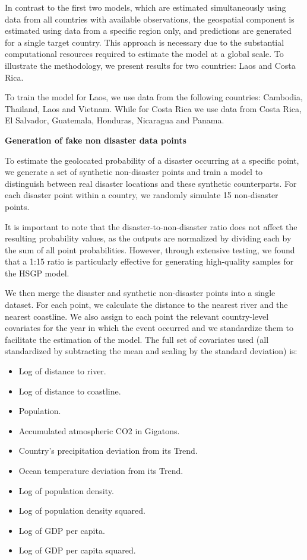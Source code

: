 In contrast to the first two models, which are estimated simultaneously using data from all countries with available observations, the geospatial component is estimated using data from a specific region only, and predictions are generated for a single target country. This approach is necessary due to the substantial computational resources required to estimate the model at a global scale. To illustrate the methodology, we present results for two countries: Laos and Costa Rica.

To train the model for Laos, we use data from the following countries: Cambodia, Thailand, Laos and Vietnam. While for Costa Rica we use data from Costa Rica, El Salvador, Guatemala, Honduras, Nicaragua and Panama.

\textbf{Generation of fake non disaster data points}

To estimate the geolocated probability of a disaster occurring at a specific point, we generate a set of synthetic non-disaster points and train a model to distinguish between real disaster locations and these synthetic counterparts. For each disaster point within a country, we randomly simulate 15 non-disaster points.

It is important to note that the disaster-to-non-disaster ratio does not affect the resulting probability values, as the outputs are normalized by dividing each by the sum of all point probabilities. However, through extensive testing, we found that a 1:15 ratio is particularly effective for generating high-quality samples for the HSGP model.

We then merge the disaster and synthetic non-disaster points into a single dataset. For each point, we calculate the distance to the nearest river and the nearest coastline. We also assign to each point the relevant country-level covariates for the year in which the event occurred and we standardize them to facilitate the estimation of the model. The full set of covariates used (all standardized by subtracting the mean and scaling by the standard deviation) is:

\begin{itemize}
    \item Log of distance to river.
    \item Log of distance to coastline.
    \item Population.
    \item Accumulated atmospheric CO2 in Gigatons.
    \item Country's precipitation deviation from its Trend.
    \item Ocean temperature deviation from its Trend.
    \item Log of population density.
    \item Log of population density squared.
    \item Log of GDP per capita.
    \item Log of GDP per capita squared.
\end{itemize}

